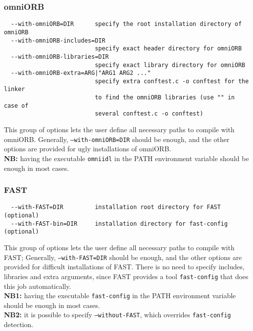 


\subsubsection{omniORB}
{\footnotesize
\begin{verbatim}
  --with-omniORB=DIR      specify the root installation directory of omniORB
  --with-omniORB-includes=DIR
                          specify exact header directory for omniORB
  --with-omniORB-libraries=DIR
                          specify exact library directory for omniORB
  --with-omniORB-extra=ARG|"ARG1 ARG2 ..."
                          specify extra conftest.c -o conftest for the linker
                          to find the omniORB libraries (use "" in case of 
                          several conftest.c -o conftest)
\end{verbatim}
}
\noindent This group of options lets the user define all necessary
paths to compile with omniORB. Generally, \texttt{--with-omniORB=DIR}
should be enough, and the other options are provided for ugly
installations of omniORB.\\ \textbf{NB:} having the executable
\texttt{omniidl} in the PATH environment variable should be enough in
most cases.

\subsubsection{FAST}\label{fast_compil}
{\footnotesize
\begin{verbatim}
  --with-FAST=DIR         installation root directory for FAST (optional)
  --with-FAST-bin=DIR     installation directory for fast-config (optional)
\end{verbatim}
}
\noindent This group of options lets the user define all necessary
paths to compile with FAST; Generally, \texttt{--with-FAST=DIR} should
be enough, and the other options are provided for difficult
installations of FAST. There is no need to specify includes, libraries
and extra arguments, since FAST provides a tool \texttt{fast-config}
that does this job automatically.\\ \textbf{NB1:} having the
executable \texttt{fast-config} in the PATH environment variable
should be enough in most cases.\\ \textbf{NB2:} it is possible to
specify \texttt{--without-FAST}, which overrides \texttt{fast-config}
detection.

